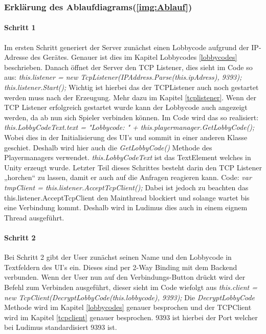\subsubsection{Erklärung des Ablaufdiagrams(\ref{img:Ablauf})}
\paragraph{Schritt 1}
Im ersten Schritt generiert der Server zunächst einen Lobbycode aufgrund der IP-Adresse des Gerätes.
Genauer ist dies im Kapitel Lobbycodes \ref{lobbycodes} beschrieben. Danach öffnet der Server den TCP Listener, dies sieht im Code so aus:
\newline \textit{ this.listener = new TcpListener(IPAddress.Parse(this.ipAdress), 9393);\newline
this.listener.Start();}\newline
Wichtig ist hierbei das der TCPListener auch noch gestartet werden muss nach der Erzeugung. Mehr dazu im Kapitel \ref{tcplistener}.
Wenn der TCP Listener erfolgreich gestartet wurde kann der Lobbycode auch angezeigt werden, da ab nun sich Spieler verbinden können. Im Code wird das so realisiert: \newline
\textit{this.LobbyCodeText.text = "Lobbycode: " + this.playermanager.GetLobbyCode();}\newline
Wobei dies in der Initialisierung des UI's und sommit in einer anderen Klasse geschiet. Deshalb wird hier auch die
\textit{GetLobbyCode()} Methode des Playermanagers verwendet. \textit{this.LobbyCodeText} ist das TextElement welches in Unity erzeugt wurde.
Letzter Teil dieses Schrittes besteht darin den TCP Listener „horchen“ zu lassen, damit er auch auf die Anfragen reagieren kann. Code: \newline
\textit{ var tmpClient = this.listener.AcceptTcpClient();} \newline
Dabei ist jedoch zu beachten das this.listener.AcceptTcpClient den Mainthread blockiert und solange wartet bis eine Verbindung kommt. Deshalb wird in Ludimus dies auch in einem eignem Thread ausgeführt.
\paragraph{Schritt 2}
Bei Schritt 2 gibt der User zunächst seinen Name und den Lobbycode in Textfeldern des UI's ein. Dieses sind per 2-Way Binding mit dem Backend verbunden.
Wenn der User nun auf den Verbindungs-Button drückt wird der Befehl zum Verbinden ausgeführt, dieser sieht im Code wiefolgt aus \newline
\textit{this.client = new TcpClient(DecryptLobbyCode(this.lobbycode), 9393);} \newline
Die \textit{DecryptLobbyCode} Methode wird im Kapitel \ref{lobbycodes} genauer besprochen und der TCPClient wird im Kapitel \ref{tcpclient} genauer besprochen. 9393 ist hierbei der Port welcher bei Ludimus standardisiert 9393 ist.
